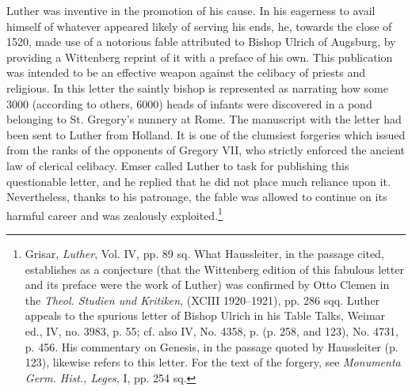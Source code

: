 Luther was inventive in the promotion of his cause. In his eagerness
to avail himself of whatever appeared likely of serving his ends,
he, towards the close of 1520, made use of a notorious fable attributed
to Bishop Ulrich of Augsburg, by providing a Wittenberg reprint
of it with a preface of his own. This publication was intended
to be an effective weapon against the celibacy of priests and religious.
In this letter the saintly bishop is represented as narrating how some
3000 (according to others, 6000) heads of infants were discovered in
a pond belonging to St. Gregory’s nunnery at Rome. The manuscript with
the letter had been sent to Luther from Holland. It is
one of the clumsiest forgeries which issued from the ranks of the opponents
of Gregory VII, who strictly enforced the ancient law of
clerical celibacy. Emser called Luther to task for publishing this questionable
letter, and he replied that he did not place much reliance
upon it. Nevertheless, thanks to his patronage, the fable was allowed
to continue on its harmful career and was zealously exploited.\footnote
{Grisar, \textit{Luther}, Vol. IV, pp. 89 sq. What Haussleiter, in the passage cited, establishes
as a conjecture (that the Wittenberg edition of this fabulous letter and its preface were
the work of Luther) was confirmed by Otto Clemen in the \textit{Theol. Studien und Kritiken},
(XCIII 1920--1921), pp. 286 sqq. Luther appeals to the spurious letter of Bishop Ulrich
in his Table Talks, Weimar ed., IV, no. 3983, p. 55; cf. also IV, No. 4358, p. (p. 258, and 123),
No. 4731, p. 456. His commentary on Genesis, in the passage quoted by Haussleiter (p. 123),
likewise refers to this letter. For the text of the forgery, see \textit{Monumenta Germ. Hist.,
Leges}, I, pp. 254 sq.}

